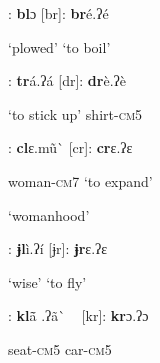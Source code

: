 \begin{styleindexi}
          [bl]:        \textbf{bl}ɔ                                      [br]:      \textbf{br}é.ʔé        
\end{styleindexi}

\begin{styleindexi}
                      ‘plowed’                                          ‘to boil’
\end{styleindexi}

\begin{styleindexi}
          [tr]:        \textbf{tr}á.ʔá                                    [dr]:      \textbf{dr}è.ʔè        
\end{styleindexi}

\begin{styleindexi}
                      ‘to stick up’                                      shirt-\textsc{cm}5  
\end{styleindexi}

\begin{styleindexi}
          [cl]:       \textbf{cl}ɛ.mũ\`{}                                    [cr]:        \textbf{cr}ɛ.ʔɛ         
\end{styleindexi}

\begin{styleindexi}
                      woman-\textsc{cm}7                                      ‘to expand’  
\end{styleindexi}

\begin{styleindexi}
                      ‘womanhood’
\end{styleindexi}

\begin{styleindexi}
          [ɉl]:         \textbf{ɉl}ì.ʔí                                    [ɉr]:        \textbf{ɉr}ɛ.ʔɛ          
\end{styleindexi}

\begin{styleindexi}
                      ‘wise’                                              ‘to fly’                  
\end{styleindexi}

\begin{styleindexi}
          [kl]:       \textbf{kl}ã\={} .ʔã\`{} ~                                    [kr]:       \textbf{kr}ɔ.ʔɔ        
\end{styleindexi}

\begin{styleindexi}
                      seat-\textsc{cm}5                                          car-\textsc{cm}5   
\end{styleindexi}

